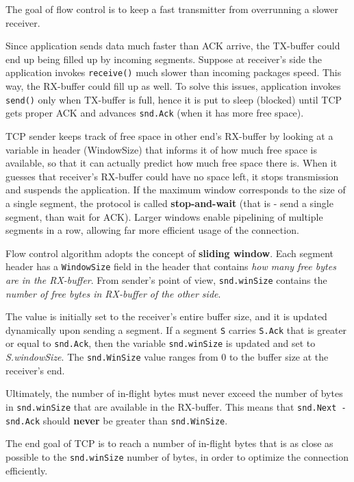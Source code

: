 \documentclass[10pt]{extbook}
\begin{document}
The goal of flow control is to keep a fast transmitter from overrunning a
slower receiver.

Since application sends data much faster than ACK arrive, the TX-buffer could
end up being filled up by incoming segments. Suppose at receiver's side the
application invokes \texttt{receive()} much slower than incoming packages
speed. This way, the RX-buffer could fill up as well. To solve this issues,
application invokes \texttt{send()} only when TX-buffer is full, hence it is
put to sleep (blocked) until TCP gets proper ACK and advances \texttt{snd.Ack}
(when it has more free space).

TCP sender keeps track of free space in other end's RX-buffer by looking at a
variable in header (WindowSize) that informs it of how much free space is
available, so that it can actually predict how much free space there is. When
it guesses that receiver's RX-buffer could have no space left, it stops
transmission and suspends the application. If the maximum window corresponds to
the size of a single segment, the protocol is called \textbf{stop-and-wait}
(that is \-- send a single segment, than wait for ACK). Larger windows enable
pipelining of multiple segments in a row, allowing far more efficient usage of
the connection.

Flow control algorithm adopts the concept of \textbf{sliding window}. Each
segment header has a \texttt{WindowSize} field in the header that contains
\emph{how many free bytes are in the RX-buffer}. From sender's point of view,
\texttt{snd.winSize} contains the \emph{number of free bytes in RX-buffer of
the other side}.

The value is initially set to the receiver's entire buffer size, and it is
updated dynamically upon sending a segment. If a segment \texttt{S} carries
\texttt{S.Ack} that is greater or equal to \texttt{snd.Ack}, then the variable
\texttt{snd.winSize} is updated and set to \emph{S.windowSize}. The
\texttt{snd.WinSize} value ranges from $0$ to the buffer size at the receiver's
end.

Ultimately, the number of in-flight bytes must never exceed the number of bytes
in \texttt{snd.winSize} that are available in the RX-buffer. This means that
\texttt{snd.Next - snd.Ack} should \textbf{never} be greater than
\texttt{snd.\-WinSize}.

The end goal of TCP is to reach a number of in-flight bytes that is as close as
possible to the \texttt{snd.winSize} number of bytes, in order to optimize the
connection efficiently.
\end{document}
